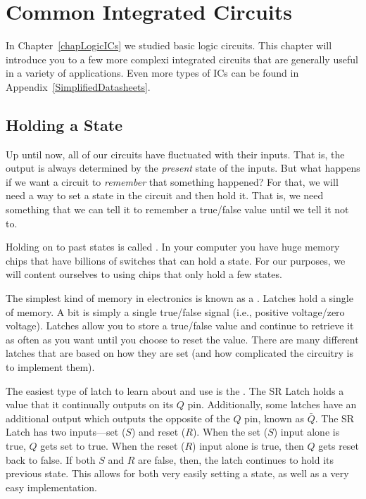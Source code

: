 \chapter{Common Integrated Circuits}

In Chapter~\ref{chapLogicICs} we studied basic logic circuits.
This chapter will introduce you to a few more complexi integrated circuits that are generally useful in a variety of applications.
Even more types of ICs can be found in Appendix~\ref{SimplifiedDatasheets}.

\section{Holding a State}

Up until now, all of our circuits have fluctuated with their inputs. 
That is, the output is always determined by the \emph{present} state of the inputs.
But what happens if we want a circuit to \emph{remember} that something happened?
For that, we will need a way to set a state in the circuit and then hold it.
That is, we need something that we can tell it to remember a true/false value until we tell it not to.

Holding on to past states is called .
In your computer you have huge memory chips that have billions of switches that can hold a state.
For our purposes, we will content ourselves to using chips that only hold a few states.

The simplest kind of memory in electronics is known as a .
Latches hold a single  of memory.
A bit is simply a single true/false signal (i.e., positive voltage/zero voltage).
Latches allow you to store a true/false value and continue to retrieve it as often as you want until you choose to reset the value.
There are many different latches that are based on how they are set (and how complicated the circuitry is to implement them).

The easiest type of latch to learn about and use is the .
The SR Latch holds a value that it continually outputs on its $Q$ pin.
Additionally, some latches have an additional output which outputs the opposite of the $Q$ pin, known as $\bar{Q}$.
The SR Latch has two inputs---set ($S$) and reset ($R$).  
When the set ($S$) input alone is true, $Q$ gets set to true.
When the reset ($R$) input alone is true, then $Q$ gets reset back to false.
If both $S$ and $R$ are false, then, the latch continues to hold its previous state.
This allows for both very easily setting a state, as well as a very easy implementation.

